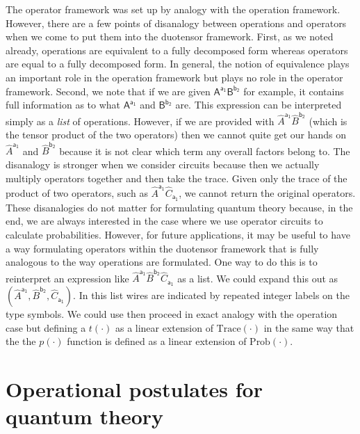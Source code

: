 \documentclass[10pt]{article}
\begin{document}
The operator framework was set up by analogy with the operation framework.   However, there are a few points of disanalogy between operations and operators when we come to put them into the duotensor framework. First, as we noted already,  operations are equivalent to a fully decomposed form whereas operators are equal to a fully decomposed form.  In general, the notion of equivalence plays an important role in the operation framework but plays no role in the operator framework. Second, we note that if we are given  $\mathsf{A^{a_1}B^{b_2}}$ for example, it contains full information as to what $\mathsf{A^{a_1}}$ and $\mathsf{B^{b_2}}$ are. This expression can be interpreted simply as a \emph{list} of operations.   However, if we are provided with $\hat{A}^\mathsf{a_1}\hat B^\mathsf{b_2}$ (which is the tensor product of the two operators) then we cannot quite get our hands on $\hat{A}^\mathsf{a_1}$ and $\hat B^\mathsf{b_2}$ because it is not clear which term any overall factors belong to.  The disanalogy is stronger when we consider circuits because then we actually multiply operators together and then take the trace.  Given only the trace of the product of two operators, such as $\hat A^\mathsf{a_1}\hat C_\mathsf{a_1}$, we cannot return the original operators.  These disanalogies do not matter for formulating quantum theory because, in the end, we are always interested in the case where we use operator circuits to calculate probabilities.  However, for future applications, it may be useful to have a way formulating operators within the duotensor framework that is fully analogous to the way operations are formulated.  One way to do this is to reinterpret an expression like $\hat{A}^\mathsf{a_1}\hat B^\mathsf{b_2} \hat C_\mathsf{a_1}$ as a list. We could expand this out as $(\hat{A}^\mathsf{a_1},\hat B^\mathsf{b_2}, \hat C_\mathsf{a_1})$.  In this list wires are indicated by repeated integer labels on the type symbols.  We could use then proceed in exact analogy with the operation case but defining a $t(\cdot)$ as a linear extension of $\text{Trace}(\cdot)$ in the same way that the the $p(\cdot)$ function is defined as a linear extension of $\text{Prob}(\cdot)$.




\newpage

\part{Operational postulates for quantum theory}\label{thereconstruction}
\end{document}
